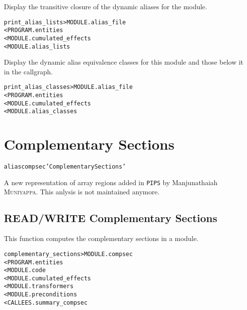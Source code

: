 \documentclass[a4paper]{report}
\newenvironment{PipsMake}{\begin{alltt}}{\end{alltt}}
\newenvironment{PipsPass}[1]{\label{pass:#1}}{}
\newcommand{\Pips}{\texttt{PIPS}}
\begin{document}
\begin{PipsPass}{print_alias_lists}
Display the transitive closure of the dynamic aliases for the module.
\end{PipsPass}
\begin{PipsMake}
print_alias_lists > MODULE.alias_file
        < PROGRAM.entities
        < MODULE.cumulated_effects
        < MODULE.alias_lists
\end{PipsMake}

\begin{PipsPass}{print_alias_classes}
Display the dynamic alias equivalence classes for this module and those
below it in the callgraph.
\end{PipsPass}
\begin{PipsMake}
print_alias_classes > MODULE.alias_file
        < PROGRAM.entities
        < MODULE.cumulated_effects
        < MODULE.alias_classes
\end{PipsMake}


\section{Complementary Sections}
\label{subsection-complementary-sections}

\begin{PipsMake}
alias compsec 'Complementary Sections'
\end{PipsMake}

A new representation of array regions added in \Pips{} by
Manjunathaiah \textsc{Muniyappa}. This anlysis is not maintained
anymore.



\subsection{READ/WRITE Complementary Sections}
\label{subsubsection-complementary-sections}

\begin{PipsPass}{complementary_sections}
This function computes the complementary sections in a module.
\end{PipsPass}
\begin{PipsMake}
complementary_sections > MODULE.compsec
        < PROGRAM.entities
        < MODULE.code
        < MODULE.cumulated_effects
        < MODULE.transformers
        < MODULE.preconditions
        < CALLEES.summary_compsec
\end{PipsMake}
\end{document}
